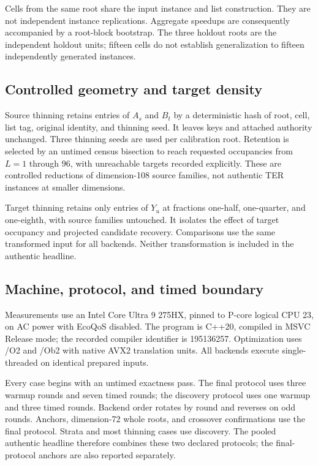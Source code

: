 \documentclass[manuscript,screen,review]{acmart}
\begin{document}
Cells from the same root share the input instance and list construction. They are not independent instance replications. Aggregate speedups are consequently accompanied by a root-block bootstrap. The three holdout roots are the independent holdout units; fifteen cells do not establish generalization to fifteen independently generated instances.

\subsection{Controlled geometry and target density}
Source thinning retains entries of $A_s$ and $B_t$ by a deterministic hash of root, cell, list tag, original identity, and thinning seed. It leaves keys and attached authority unchanged. Three thinning seeds are used per calibration root. Retention is selected by an untimed census bisection to reach requested occupancies from $L=1$ through $96$, with unreachable targets recorded explicitly. These are controlled reductions of dimension-108 source families, not authentic TER instances at smaller dimensions.

Target thinning retains only entries of $Y_u$ at fractions one-half, one-quarter, and one-eighth, with source families untouched. It isolates the effect of target occupancy and projected candidate recovery. Comparisons use the same transformed input for all backends. Neither transformation is included in the authentic headline.

\subsection{Machine, protocol, and timed boundary}
Measurements use an Intel Core Ultra 9 275HX, pinned to P-core logical CPU 23, on AC power with EcoQoS disabled. The program is C++20, compiled in MSVC Release mode; the recorded compiler identifier is 195136257. Optimization uses /O2 and /Ob2 with native AVX2 translation units. All backends execute single-threaded on identical prepared inputs.

Every case begins with an untimed exactness pass. The final protocol uses three warmup rounds and seven timed rounds; the discovery protocol uses one warmup and three timed rounds. Backend order rotates by round and reverses on odd rounds. Anchors, dimension-72 whole roots, and crossover confirmations use the final protocol. Strata and most thinning cases use discovery. The pooled authentic headline therefore combines these two declared protocols; the final-protocol anchors are also reported separately.
\end{document}

